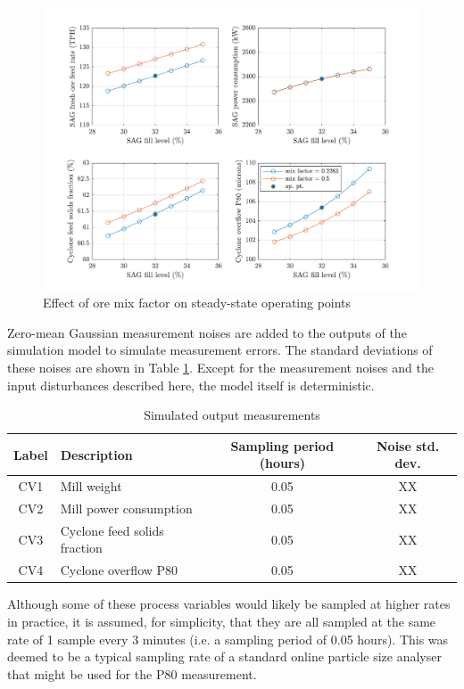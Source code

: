 \begin{figure}[htp]
	\centering
	\includegraphics[width=15cm]{images/grind_sim_ss_plot2.pdf}
	\caption{Effect of ore mix factor on steady-state operating points}
	\label{fig:grind_sim_ss_plot2}
\end{figure}

Zero-mean Gaussian measurement noises are added to the outputs of the simulation model to simulate measurement errors. The standard deviations of these noises are shown in Table \ref{tb:meas-noise}. Except for the measurement noises and the input disturbances described here, the model itself is deterministic.


\begin{table}[h!]
	\centering
	\caption{Simulated output measurements} \label{tb:meas-noise}
	\begin{tabular}{c >{\raggedright}p{5.5cm} c c}
		Label & Description & Sampling period (hours) & Noise std. dev. \\
		\midrule
		CV1        & Mill weight & 0.05 & XX \\ 
		CV2       & Mill power consumption & 0.05 & XX \\ 
		CV3       & Cyclone feed solids fraction & 0.05 & XX \\ 
		CV4       & Cyclone overflow P80 & 0.05 & XX \\ 
		\bottomrule
	\end{tabular}
\end{table}


Although some of these process variables would likely be sampled at higher rates in practice, it is assumed, for simplicity, that they are all sampled at the same rate of 1 sample every 3 minutes (i.e. a sampling period of 0.05 hours). This was deemed to be a typical sampling rate of a standard online particle size analyser that might be used for the P80 measurement.


